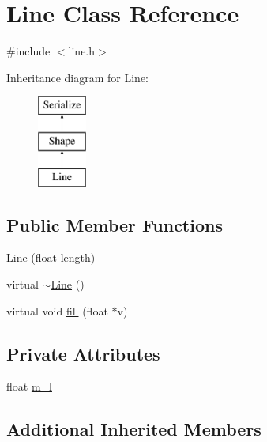 \hypertarget{classLine}{\section{Line Class Reference}
\label{classLine}
}


{\ttfamily \#include $<$line.\-h$>$}

Inheritance diagram for Line\-:\begin{figure}[H]
\begin{center}
\leavevmode
\includegraphics[height=3.000000cm]{classLine}
\end{center}
\end{figure}
\subsection*{Public Member Functions}
\begin{DoxyCompactItemize}
\item 
\hyperlink{classLine_af13fbd7711414690b1ba1527636009ab}{Line} (float length)
\item 
virtual \hyperlink{classLine_aabe85f48d22d92b62257091f48174fac}{$\sim$\-Line} ()
\item 
virtual void \hyperlink{classLine_a3f357683e8a9700cfc4d6f65f7f9493f}{fill} (float $\ast$v)
\end{DoxyCompactItemize}
\subsection*{Private Attributes}
\begin{DoxyCompactItemize}
\item 
float \hyperlink{classLine_ab7c1828bc8bc4e3647dfdd963c17d555}{m\-\_\-l}
\end{DoxyCompactItemize}
\subsection*{Additional Inherited Members}


